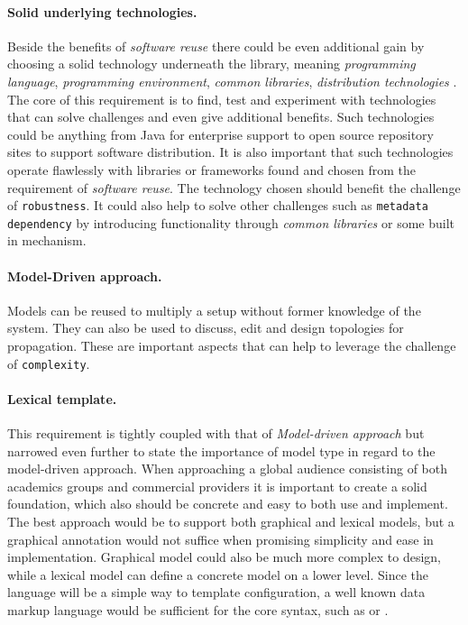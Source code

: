\paragraph{Solid underlying technologies.}
Beside the benefits of \emph{software reuse} there could be even additional gain by choosing
a solid technology underneath the library, meaning \emph{programming language},
\emph{programming environment}, \emph{common libraries}, \emph{distribution technologies} \etc.
The core of this requirement is to find, test and experiment with technologies that can solve
challenges and even give additional benefits.
Such technologies could be anything from Java for enterprise support to open source repository
sites to support software distribution.
It is also important that such technologies operate flawlessly with libraries or frameworks
found and chosen from the requirement of \emph{software reuse}.
The technology chosen should benefit the challenge of \texttt{robustness}.
It could also help to solve other challenges such as \texttt{metadata dependency} by introducing
functionality through \emph{common libraries} or some built in mechanism.

\paragraph{Model-Driven approach.}
Models can be reused to multiply a setup without former knowledge of the system.
They can also be used to discuss, edit and design topologies for propagation. 
These are important aspects that can help to leverage the challenge of \texttt{complexity}.

\paragraph{Lexical template.}
This requirement is tightly coupled with that of \emph{Model-driven approach} but narrowed 
even further to state the importance of model type in regard to the model-driven approach.
When approaching a global audience consisting of both academics groups and commercial
providers it is important to create a solid foundation, 
which also should be concrete and easy to both use and implement.
The best approach would be to support both graphical and lexical models, 
but a graphical annotation would not suffice when promising simplicity and ease in implementation. 
Graphical model could also be much more complex to design, 
while a lexical model can define a concrete model on a lower level.
Since the language will be a simple way to template configuration, 
a well known data markup language would be sufficient for the core syntax, such as 
 or .

